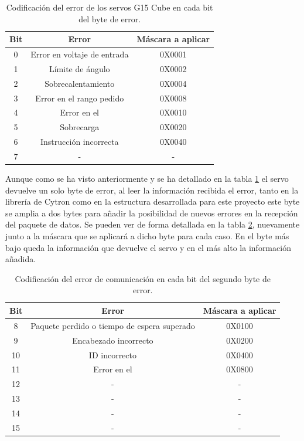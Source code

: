 	\begin{table}[htbp]
		\centering
		\caption{Codificación del error de los servos G15 Cube en cada bit del byte de error.}
		\label{tab:g15_error}
		\begin{center}
			\begin{tabular}{|c|c|c|}
				\hline
				\textbf{Bit} & \textbf{Error} & \textbf{Máscara a aplicar} \\
				\hline
				0 & Error en voltaje de entrada & 0X0001 \\
				\hline
				1 & Límite de ángulo & 0X0002 \\
				\hline
				2 & Sobrecalentamiento & 0X0004 \\
				\hline
				3 & Error en el rango pedido & 0X0008 \\
				\hline
				4 & Error en el \ingles{CheckSum} & 0X0010 \\
				\hline
				5 & Sobrecarga & 0X0020 \\
				\hline
				6 & Instrucción incorrecta & 0X0040 \\
				\hline
				7 & - & -  \\
				\hline
			\end{tabular}
		\end{center}
	\end{table}
	
	Aunque como se ha visto anteriormente y se ha detallado en la tabla \ref{tab:g15_error} el servo devuelve un solo byte de error, al leer la información recibida el error, tanto en la librería de Cytron como en la estructura desarrollada para este proyecto este byte se amplia a dos bytes para añadir la posibilidad de nuevos errores en la recepción del paquete de datos. Se pueden ver de forma detallada en la tabla \ref{tab:g15_error_second}, nuevamente junto a la máscara que se aplicará a dicho byte para cada caso. En el byte más bajo queda la información que devuelve el servo y en el más alto la información añadida.
	\\ 
	
	\begin{table}[htbp]
		\centering
		\caption{Codificación del error de comunicación en cada bit del segundo byte de error.}
		\label{tab:g15_error_second}
		\begin{center}
			\begin{tabular}{|c|c|c|}
				\hline
				\textbf{Bit} & \textbf{Error} & \textbf{Máscara a aplicar} \\
				\hline
				8 & Paquete perdido o tiempo de espera superado & 0X0100 \\
				\hline
				9 & Encabezado incorrecto & 0X0200 \\
				\hline
				10 & ID incorrecto & 0X0400 \\
				\hline
				11 & Error en el \ingles{CheckSum} & 0X0800 \\
				\hline
				12 & - & -  \\
				\hline
				13 & - & -  \\
				\hline
				14 & - & -  \\
				\hline
				15 & - & -  \\
				\hline
			\end{tabular}
		\end{center}
	\end{table}

